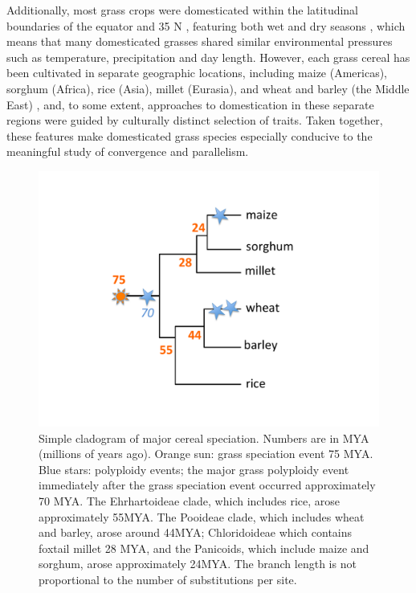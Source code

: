 \documentclass[12pt]{article}
\begin{document}
Additionally, most grass crops were domesticated within the latitudinal boundaries of the equator and 35 N \citep{Jain1993, Gepts2010}, featuring both wet and dry seasons \citep{Jain1993}, which means that many domesticated grasses shared similar environmental pressures such as temperature, precipitation and day length.
However, each grass cereal has been cultivated in separate geographic locations, including maize (Americas), sorghum (Africa), rice (Asia), millet (Eurasia), and wheat and barley (the Middle East) \citep{Glmin2009}, and, to some extent, approaches to domestication in these separate regions were guided by culturally distinct selection of traits.
Taken together, these features make domesticated grass species especially conducive to the meaningful study of convergence and parallelism.


\begin{figure}[h]
    \centering
    \includegraphics[width=15cm]{Figure_1.pdf}
    \caption{Simple cladogram of major cereal speciation. Numbers are in MYA (millions of years ago).
Orange sun: grass speciation event 75 MYA.  Blue stars: polyploidy events; 
the major grass polyploidy event immediately after the grass speciation event occurred 
approximately 70 MYA. The Ehrhartoideae clade, which includes rice, arose 
approximately 55MYA. The Pooideae clade, which includes wheat and barley, 
arose around 44MYA; Chloridoideae which contains foxtail millet 28 MYA, and the Panicoids, 
which include maize and sorghum, arose approximately 24MYA. The branch length is not 
proportional to the number of substitutions per site.
}
    \label{fig:grassphylo}
\end{figure}
\end{document}
